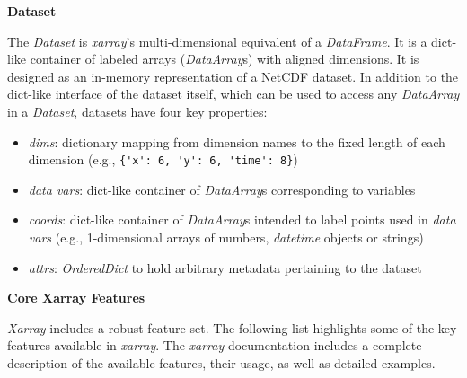 \documentclass{jors}
\begin{document}
\textbf{Dataset}

The \textit{Dataset} is \textit{xarray}’s multi-dimensional equivalent of a \textit{DataFrame}. It is a dict-like container of labeled arrays (\textit{DataArray}s) with aligned dimensions.
It is designed as an in-memory representation of a NetCDF dataset.
In addition to the dict-like interface of the dataset itself, which can be used to access any \textit{DataArray} in a \textit{Dataset}, datasets have four key properties:

\begin{itemize}
	\item \textit{dims}: dictionary mapping from dimension names to the fixed length of each dimension (e.g., \verb|{'x': 6, 'y': 6, 'time': 8}|)
	\item \textit{data vars}: dict-like container of \textit{DataArray}s corresponding to variables
	\item \textit{coords}: dict-like container of \textit{DataArray}s intended to label points used in \textit{data vars} (e.g., 1-dimensional arrays of numbers, \textit{datetime} objects or strings)
	\item \textit{attrs}: \textit{OrderedDict} to hold arbitrary metadata pertaining to the dataset
\end{itemize}

\textbf{Core Xarray Features}

\textit{Xarray} includes a robust feature set.
The following list highlights some of the key features available in \textit{xarray}.
The \textit{xarray} documentation \citep{xarray_docs} includes a complete description of the available features, their usage, as well as detailed examples.
\end{document}

